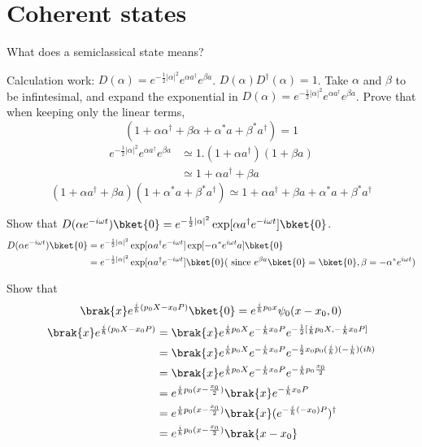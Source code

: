 \section{Coherent states}
What does a semiclassical state means?

Calculation work: $D(\alpha)=e^{-\frac{1}{2}|\alpha|^2}e^{\alpha a^{\dagger}}e^{\beta a}$. $D(\alpha)D^{\dagger}(\alpha)=1$. Take $\alpha$ and $\beta$ to be infintesimal, and expand the exponential in $D(\alpha)=e^{-\frac{1}{2}|\alpha|^2}e^{\alpha a^{\dagger}}e^{\beta a}$. Prove that when keeping only the linear terms,
$$
(1+\alpha\alpha^{\dagger}+\beta\alpha+\alpha^{*}a+\beta^{*}a^{\dagger})=1
$$
$$
\begin{aligned}
e^{-\frac{1}{2}|\alpha|^2}e^{\alpha a^{\dagger}}e^{\beta a}&\simeq 1.(1+\alpha a^{\dagger})(1+\beta a)\\
&\simeq 1+\alpha a^{\dagger}+\beta a 
\end{aligned}
$$
$$
(1+\alpha a^{\dagger}+\beta a )(1+\alpha^{*} a+\beta^{*} a^{\dagger} )\simeq 1+\alpha a^{\dagger}+\beta a+\alpha^{*} a+\beta^{*} a^{\dagger}
$$

Show that $D(\alpha e^{-i\omega t})\bket{0}=e^{-\frac{1}{2}|\alpha|^2}\exp[\alpha a^{\dagger}e^{-i\omega t}]\bket{0}$.
$$
\begin{aligned}
D(\alpha e^{-i\omega t})\bket{0}&=e^{-\frac{1}{2}|\alpha|^2}\exp[\alpha a^{\dagger}e^{-i\omega t}]\exp[-\alpha^{*}e^{i\omega t}a]\bket{0}\\
&=e^{-\frac{1}{2}|\alpha|^2}\exp[\alpha a^{\dagger}e^{-i\omega t}]\bket{0} (\text{ since }e^{\beta a}\bket{0}=\bket{0}, \beta =-\alpha^{*}e^{i\omega t})
\end{aligned}
$$


Show that $$
\brak{x}e^{\frac{i}{\hbar}(p_0X-x_0P)}\bket{0}=e^{\frac{i}{\hbar}p_0x}\psi_0(x-x_0,0)
$$
$$
\begin{aligned}
\brak{x}e^{\frac{i}{\hbar}(p_0X-x_0P)}&=\brak{x}e^{\frac{i}{\hbar}p_0X}e^{-\frac{i}{\hbar}x_0P}e^{-\frac{1}{2}[\frac{i}{\hbar}p_0X,-\frac{i}{\hbar}x_0P]}\\
&=\brak{x}e^{\frac{i}{\hbar}p_0X}e^{-\frac{i}{\hbar}x_0P}e^{-\frac{1}{2}x_0p_0(\frac{i}{\hbar})(-\frac{i}{\hbar})(i\hbar)}\\
&=\brak{x}e^{\frac{i}{\hbar}p_0X}e^{-\frac{i}{\hbar}x_0P}e^{-\frac{i}{\hbar}p_0\frac{x_0}{2}}\\
&=e^{\frac{i}{\hbar}p_0(x-\frac{x_0}{2})}\brak{x}e^{-\frac{i}{\hbar}x_0P}\\
&=e^{\frac{i}{\hbar}p_0(x-\frac{x_0}{2})}\brak{x}(e^{-\frac{i}{\hbar}(-x_0)P})^{\dagger}\\
&=e^{\frac{i}{\hbar}p_0(x-\frac{x_0}{2})}\brak{x-x_0}
\end{aligned}
$$